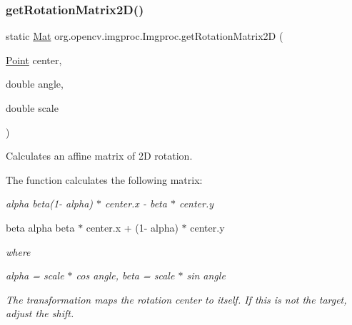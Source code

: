\subsubsection{\texorpdfstring{get\+Rotation\+Matrix2\+D()}{getRotationMatrix2D()}}
{\footnotesize\ttfamily static \mbox{\hyperlink{classorg_1_1opencv_1_1core_1_1_mat}{Mat}} org.\+opencv.\+imgproc.\+Imgproc.\+get\+Rotation\+Matrix2D (\begin{DoxyParamCaption}\item[{\mbox{\hyperlink{classorg_1_1opencv_1_1core_1_1_point}{Point}}}]{center,  }\item[{double}]{angle,  }\item[{double}]{scale }\end{DoxyParamCaption})\hspace{0.3cm}{\ttfamily [static]}}

Calculates an affine matrix of 2D rotation.

The function calculates the following matrix\+:

{\itshape alpha beta(1-\/ alpha) $\ast$ center.\+x -\/ beta $\ast$ center.\+y
\begin{DoxyItemize}
\item beta alpha beta $\ast$ center.\+x + (1-\/ alpha) $\ast$ center.\+y 
\end{DoxyItemize}}

{\itshape }

{\itshape }

{\itshape where}

{\itshape }

{\itshape }

{\itshape {\itshape alpha = scale $\ast$ cos angle, beta = scale $\ast$ sin angle }}

{\itshape }

{\itshape }

{\itshape The transformation maps the rotation center to itself. If this is not the target, adjust the shift.}

{\itshape }

